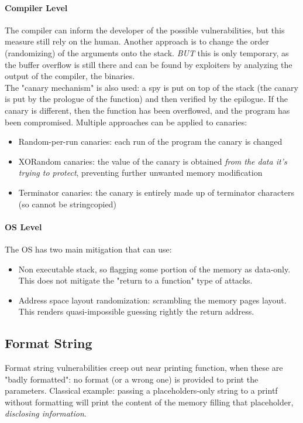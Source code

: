 \documentclass{article}
\begin{document}
					\paragraph{Compiler Level}
						The compiler can inform the developer of the possible vulnerabilities, but this measure still rely on the human. Another approach is to change the order (randomizing) of the arguments onto the stack. \emph{BUT} this is only temporary, as the buffer overflow is still there and can be found by exploiters by analyzing the output of the compiler, the binaries.\\
						The "canary mechanism" is also used: a spy is put on top of the stack (the canary is put by the prologue of the function) and then verified by the epilogue. If the canary is different, then the function has been overflowed, and the program has been compromised. Multiple approaches can be applied to canaries:
						\begin{itemize}
							\item Random-per-run canaries: each run of the program the canary is changed
							\item XORandom canaries: the value of the canary is obtained \emph{from the data it's trying to protect}, preventing further unwanted memory modification
							\item Terminator canaries: the canary is entirely made up of terminator characters (so cannot be stringcopied)
						\end{itemize}
						
					\paragraph{OS Level}
						The OS has two main mitigation that can use:
						\begin{itemize}
							\item Non executable stack, so flagging some portion of the memory as data-only. This does not mitigate the "return to a function" type of attacks.
							\item Address space layout randomization: scrambling the memory pages layout. This renders quasi-impossible guessing rightly the return address.
						\end{itemize}
						
			\subsection{Format String}
				Format string vulnerabilities creep out near printing function, when these are "badly formatted": no format (or a wrong one) is provided to print the parameters. Classical example: passing a placeholders-only string to a printf without formatting will print the content of the memory filling that placeholder, \emph{disclosing information}.
				
\end{document}
